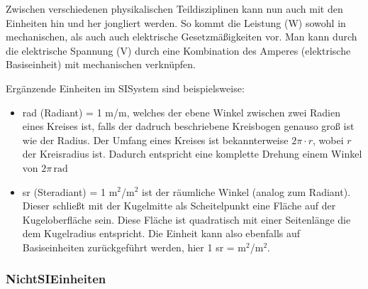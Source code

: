 \documentclass[letterpaper,10pt,english]{jupyterBook}
\begin{document}
\sphinxAtStartPar
Zwischen verschiedenen physikalischen Teildisziplinen kann nun auch mit den Einheiten hin und her jongliert werden. So kommt die Leistung (W) sowohl in mechanischen, als auch auch elektrische Gesetzmäßigkeiten vor. Man kann durch die elektrische Spannung (V) durch eine Kombination des Amperes (elektrische Basiseinheit) mit mechanischen verknüpfen.

\sphinxAtStartPar
Ergänzende Einheiten im SI\sphinxhyphen{}System sind beispielsweise:
\begin{itemize}
\item {} 
 rad (Radiant) = 1 m/m, welches der ebene Winkel zwischen zwei Radien eines Kreises ist, falls der dadruch beschriebene Kreisbogen genauso groß ist wie der Radius. Der Umfang eines Kreises ist bekannterweise \(2\pi \cdot r\), wobei \(r\) der Kreisradius ist. Dadurch entspricht eine komplette Drehung einem Winkel von \(2\pi\,\mathrm{rad}\)

\item {} 
 sr (Steradiant) = 1 m\(^2\)/m\(^2\) ist der räumliche Winkel (analog zum Radiant). Dieser schließt mit der Kugelmitte als Scheitelpunkt eine Fläche auf der Kugeloberfläche sein. Diese Fläche ist quadratisch mit einer Seitenlänge die dem Kugelradius entspricht. Die Einheit kann also ebenfalls auf Basiseinheiten zurückgeführt werden, hier 1 sr = m\(^2\)/m\(^2\).

\end{itemize}


\subsubsection{Nicht\sphinxhyphen{}SI\sphinxhyphen{}Einheiten}
\label{\detokenize{content/1_Messen_Einheit:nicht-si-einheiten}}
\sphinxAtStartPar
\end{document}
